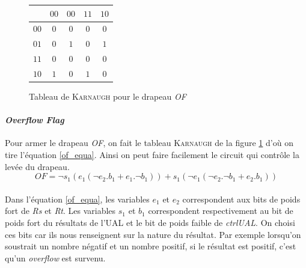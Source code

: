 \begin{figure}
	\centering
	\begin{tabular}{|c|c|c|c|c|}
	\hline \backslashbox{$s_{1}e_{1}$}{$e_ {2}b_{1}$} & $00$ & $00$ & $11$ & $10$ \\ 
	\hline $00$ & $0$ & $0$ & $0$ & $0$ \\ 
	\hline $01$ & $0$ & $1$ & $0$ & $1$ \\ 
	\hline $11$ & $0$ & $0$ & $0$ & $0$ \\ 
	\hline $10$ & $1$ & $0$ & $1$ & $0$ \\ 
	\hline 
	\end{tabular}
	\caption{\label{of_karnaugh} Tableau de \textsc{Karnaugh} pour le drapeau \textit{OF}}
\end{figure}

\paragraph{\textit{Overflow Flag}}{
	Pour armer le drapeau \textit{OF}, on fait le tableau \textsc{Karnaugh}
	de la figure \ref{of_karnaugh} d'où on tire l'équation \ref{of_equa}.
	Ainsi on peut faire facilement le circuit qui contrôle la levée du drapeau. 
}
	\begin{equation}
		\label{of_equa}
		{OF} = \neg s_{1} ( e_{1} ( \neg e_{2} . b_{1} + e_{1} . \neg b_{1} ) ) 
			+ s_{1} ( \neg e_{1} ( \neg e_{2} . \neg b_{1} + e_{2} . b_{1} ))
	\end{equation}

\paragraph{}{
	Dans l'équation \ref{of_equa}, les variables  $e_{1}$ et $e_{2}$ correspondent aux 
	bits de poids fort de \textit{Rs} et \textit{Rt}. Les variables $s_{1}$ et $b_{1}$
	correspondent respectivement au bit de poids fort du résultats de l'UAL et 
	le bit de poids faible de \textit{ctrlUAL}. On choisi ces bits car
	ils nous renseignent sur la nature du résultat. Par exemple lorsqu'on soustrait un 
	nombre négatif et un nombre positif, si le résultat est positif, c'est qu'un 
	\textit{overflow} est survenu.
	
}